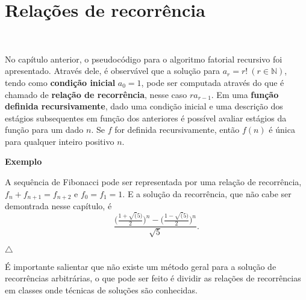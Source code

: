 \section{Relações de recorrência}
\

No capítulo anterior, o pseudocódigo para o algoritmo fatorial recursivo foi apresentado. Através dele, é observável que a solução para $a_r = r! \ (r \in \mathbb{N})$, tendo como \textbf{condição inicial} $a_0 = 1$, pode ser computada através do que é chamado de \textbf{relação de recorrência}, nesse caso $ra_{r-1}$. Em uma \textbf{função definida recursivamente}, dado uma condição inicial e uma descrição dos estágios subsequentes em função dos anteriores é possível avaliar estágios da função para um dado $n$. Se $f$ for definida recursivamente, então $f(n)$ é única para qualquer inteiro positivo $n$.

\textbf{Exemplo}

A sequência de Fibonacci pode ser representada por uma relação de recorrência, $f_{n}+f_{n+1}=f_{n+2}$ e $f_0=f_1=1$. E a solução da recorrência, que não cabe ser demontrada nesse capítulo, é
\[\frac{\Bigr(\frac{1+\sqrt(5)}{2}\Bigr)^n-\Bigr(\frac{1-\sqrt(5)}{2}\Bigr)^n}{\sqrt{5}}.\]

{\raggedleft $\bigtriangleup$ \par}

É importante salientar que não existe um método geral para a solução de recorrências arbitrárias, o que pode ser feito é dividir as relações de recorrências em classes onde técnicas de soluções são conhecidas.